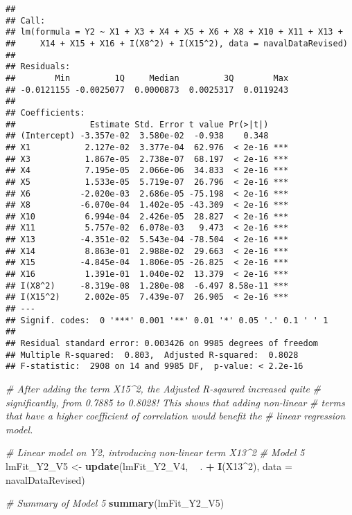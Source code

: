 \documentclass[
]{article}
\newenvironment{Shaded}{\begin{snugshade}}{\end{snugshade}}
\newcommand{\CommentTok}[1]{\textcolor[rgb]{0.56,0.35,0.01}{\textit{#1}}}
\newcommand{\DataTypeTok}[1]{\textcolor[rgb]{0.13,0.29,0.53}{#1}}
\newcommand{\DecValTok}[1]{\textcolor[rgb]{0.00,0.00,0.81}{#1}}
\newcommand{\KeywordTok}[1]{\textcolor[rgb]{0.13,0.29,0.53}{\textbf{#1}}}
\newcommand{\NormalTok}[1]{#1}
\newcommand{\OperatorTok}[1]{\textcolor[rgb]{0.81,0.36,0.00}{\textbf{#1}}}
\newcommand{\StringTok}[1]{\textcolor[rgb]{0.31,0.60,0.02}{#1}}
\begin{document}
\begin{verbatim}
## 
## Call:
## lm(formula = Y2 ~ X1 + X3 + X4 + X5 + X6 + X8 + X10 + X11 + X13 + 
##     X14 + X15 + X16 + I(X8^2) + I(X15^2), data = navalDataRevised)
## 
## Residuals:
##        Min         1Q     Median         3Q        Max 
## -0.0121155 -0.0025077  0.0000873  0.0025317  0.0119243 
## 
## Coefficients:
##               Estimate Std. Error t value Pr(>|t|)    
## (Intercept) -3.357e-02  3.580e-02  -0.938    0.348    
## X1           2.127e-02  3.377e-04  62.976  < 2e-16 ***
## X3           1.867e-05  2.738e-07  68.197  < 2e-16 ***
## X4           7.195e-05  2.066e-06  34.833  < 2e-16 ***
## X5           1.533e-05  5.719e-07  26.796  < 2e-16 ***
## X6          -2.020e-03  2.686e-05 -75.198  < 2e-16 ***
## X8          -6.070e-04  1.402e-05 -43.309  < 2e-16 ***
## X10          6.994e-04  2.426e-05  28.827  < 2e-16 ***
## X11          5.757e-02  6.078e-03   9.473  < 2e-16 ***
## X13         -4.351e-02  5.543e-04 -78.504  < 2e-16 ***
## X14          8.863e-01  2.988e-02  29.663  < 2e-16 ***
## X15         -4.845e-04  1.806e-05 -26.825  < 2e-16 ***
## X16          1.391e-01  1.040e-02  13.379  < 2e-16 ***
## I(X8^2)     -8.319e-08  1.280e-08  -6.497 8.58e-11 ***
## I(X15^2)     2.002e-05  7.439e-07  26.905  < 2e-16 ***
## ---
## Signif. codes:  0 '***' 0.001 '**' 0.01 '*' 0.05 '.' 0.1 ' ' 1
## 
## Residual standard error: 0.003426 on 9985 degrees of freedom
## Multiple R-squared:  0.803,  Adjusted R-squared:  0.8028 
## F-statistic:  2908 on 14 and 9985 DF,  p-value: < 2.2e-16
\end{verbatim}

\begin{Shaded}
\begin{Highlighting}[]
\CommentTok{# After adding the term X15^2, the Adjusted R-sqaured increased quite }
\CommentTok{# significantly, from 0.7885 to 0.8028! This shows that adding non-linear}
\CommentTok{# terms that have a higher coefficient of correlation would benefit the }
\CommentTok{# linear regression model.}

\CommentTok{# Linear model on Y2, introducing non-linear term X13^2}
\CommentTok{# Model 5}
\NormalTok{lmFit_Y2_V5 <-}\StringTok{ }\KeywordTok{update}\NormalTok{(lmFit_Y2_V4, }\OperatorTok{~}\StringTok{ }\NormalTok{. }\OperatorTok{+}\StringTok{ }\KeywordTok{I}\NormalTok{(X13}\OperatorTok{^}\DecValTok{2}\NormalTok{), }\DataTypeTok{data =}\NormalTok{ navalDataRevised)}

\CommentTok{# Summary of Model 5}
\KeywordTok{summary}\NormalTok{(lmFit_Y2_V5)}
\end{Highlighting}
\end{Shaded}
\end{document}
